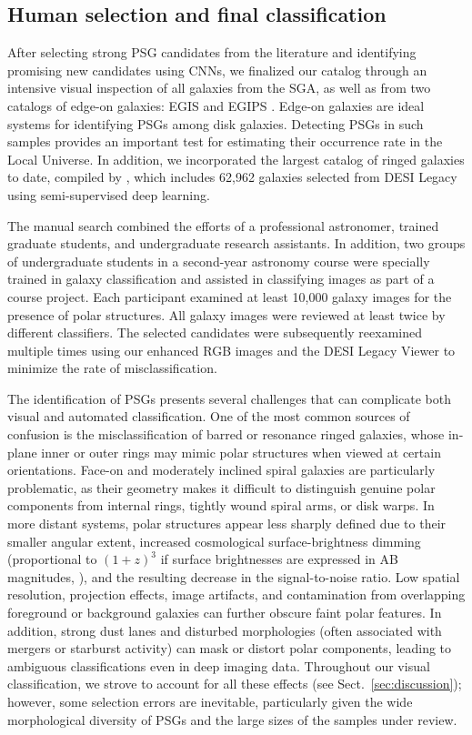 \documentclass{aa}
\begin{document}
\subsection{Human selection and final classification}\label{subsec:human_selec}

After selecting strong PSG candidates from the literature and identifying promising new candidates using CNNs, we finalized our catalog through an intensive visual inspection of all galaxies from the SGA, as well as from two catalogs of edge-on galaxies: EGIS \citep[][5,747 galaxies]{2014ApJ...787...24B} and EGIPS \citep[][16,551 galaxies]{2022MNRAS.511.3063M}. Edge-on galaxies are ideal systems for identifying PSGs among disk galaxies. Detecting PSGs in such samples provides an important test for estimating their occurrence rate in the Local Universe. In addition, we incorporated the largest catalog of ringed galaxies to date, compiled by \citet{2025ApJS..280...11C}, which includes 62,962 galaxies selected from DESI Legacy using semi-supervised deep learning.

The manual search combined the efforts of a professional astronomer, trained graduate students, and undergraduate research assistants. In addition, two groups of undergraduate students in a second-year astronomy course were specially trained in galaxy classification and assisted in classifying images as part of a course project. Each participant examined at least 10,000 galaxy images for the presence of polar structures. All galaxy images were reviewed at least twice by different classifiers. The selected candidates were subsequently reexamined multiple times using our enhanced RGB images and the DESI Legacy Viewer to minimize the rate of misclassification.

The identification of PSGs presents several challenges that can complicate both visual and automated classification. One of the most common sources of confusion is the misclassification of barred or resonance ringed galaxies, whose in-plane inner or outer rings may mimic polar structures when viewed at certain orientations. Face-on and moderately inclined spiral galaxies are particularly problematic, as their geometry makes it difficult to distinguish genuine polar components from internal rings, tightly wound spiral arms, or disk warps. In more distant systems, polar structures appear less sharply defined due to their smaller angular extent, increased cosmological surface-brightness dimming (proportional to $(1+z)^3$ if surface brightnesses are expressed in AB magnitudes, \citealt{2020ApJ...903...14W}), and the resulting decrease in the signal-to-noise ratio. Low spatial resolution, projection effects, image artifacts, and contamination from overlapping foreground or background galaxies can further obscure faint polar features. In addition, strong dust lanes and disturbed morphologies (often associated with mergers or starburst activity) can mask or distort polar components, leading to ambiguous classifications even in deep imaging data. Throughout our visual classification, we strove to account for all these effects (see Sect.~\ref{sec:discussion}); however, some selection errors are inevitable, particularly given the wide morphological diversity of PSGs and the large sizes of the samples under review.
\end{document}
